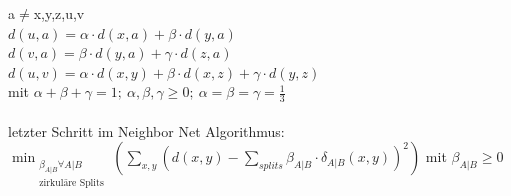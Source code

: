 a$\neq$x,y,z,u,v\\
$d(u,a)=\alpha \cdot d(x,a) + \beta \cdot d(y,a)$\\
$d(v,a)=\beta \cdot d(y,a) + \gamma \cdot d(z,a)$\\
$d(u,v)=\alpha \cdot d(x,y) + \beta \cdot d(x,z) + \gamma \cdot d(y,z)$\\
mit $\alpha + \beta + \gamma = 1;\ \alpha,\beta,\gamma \geq 0;\ \alpha=\beta=\gamma=\frac{1}{3}$\\\\
letzter Schritt im Neighbor Net Algorithmus:\\
$\displaystyle \min_{\substack{\beta_{A|B} \forall A|B \\ \text{zirkuläre Splits}}} (\sum_{x,y} (d(x,y) - \sum_{splits} \beta_{A|B} \cdot \delta_{A|B}(x,y))^2)$ mit $\beta_{A|B} \geq 0$
\\\\
